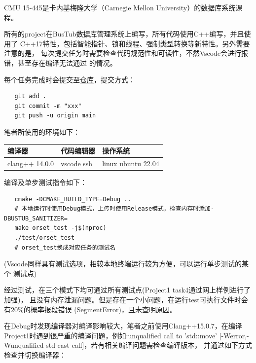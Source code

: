 \documentclass[a4paper]{article}
\begin{document}
CMU 15-445是卡内基梅隆大学（Carnegie Mellon University）的数据库系统课程。

所有的project在BusTub数据库管理系统上编写，所有代码使用C++编写，并且使用了
C++17特性，包括智能指针、锁和线程、强制类型转换等新特性。另外需要注意的是，
每次提交任务时需要检查代码规范性和可读性，不然Vscode会进行报错，甚至存在编译无法通过
的情况。

每个任务完成时会提交至\href{https://github.com/aakennes/Database}{仓库}，提交方式：

\begin{verbatim}
   git add .
   git commit -m "xxx"
   git push -u origin main
\end{verbatim}

笔者所使用的环境如下：

\begin{table}[h!]
   \begin{tabular}{|l|l|l|}
   \hline
   编译器            & 代码编辑器      & 操作系统               \\  \hline
   clang++ 14.0.0 & vscode ssh & linux ubuntu 22.04 \\  \hline
   \end{tabular}
\end{table}

编译及单步测试指令如下：

\begin{verbatim}
   cmake -DCMAKE_BUILD_TYPE=Debug ..
   # 本地运行时使用Debug模式，上传时使用Release模式，检查内存时添加-DBUSTUB_SANITIZER=
   make orset_test -j$(nproc)
   ./test/orset_test
   # orset_test换成对应任务的测试名
\end{verbatim}

(Vscode同样具有测试选项，相较本地终端运行较为方便，可以运行单步测试的某个
测试点)

经过测试，在三个模式下均可通过所有测试点(Project1 task4通过网上样例进行了加强)，
且没有内存泄漏问题。但是存在一个小问题，在运行test可执行文件时会有20\%的概率报段错误
(SegmentError)，且未查明原因。

在Debug时发现编译器对编译影响较大，笔者之前使用Clang++15.0.7，在编译
Project1时遇到很严重的编译问题，例如:unqualified call to 'std::move'
[-Werror,-Wunqualified-std-cast-call]，若有相关编译问题需检查编译版本，
并通过如下方式检查并切换编译器：
\end{document}
